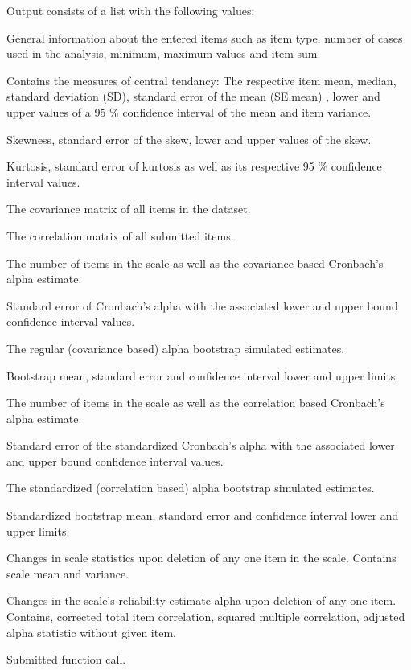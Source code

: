 \begin{Value}
Output consists of a list with the following values:\\

\begin{ldescription}
\item[\code{Variables}] General information about the entered items such as item type, number of cases used in the analysis, minimum, maximum values and item sum. 
\item[\code{Tendency}] Contains the measures of central tendancy: The respective item mean, median, standard deviation (SD), standard error of the mean (SE.mean) , lower and upper values of a 95 \% confidence interval of the mean and item variance. 
\item[\code{Skewness}] Skewness, standard error of the skew, lower and upper values of the skew. 
\item[\code{Kurtosis}] Kurtosis, standard error of kurtosis as well as its respective 95 \% confidence interval values. 
\item[\code{Covariance}] The covariance matrix of all items in the dataset. 
\item[\code{Correlation}] The correlation matrix of all submitted items. 
\item[\code{Alpha}] The number of items in the scale as well as the covariance based Cronbach's alpha estimate. 
\item[\code{Conf.Alpha}] Standard error of Cronbach's alpha with the associated lower and upper bound confidence interval values. 
\item[\code{Bootstrap.Simmulations}] The regular (covariance based) alpha bootstrap simulated estimates. 
\item[\code{Alpha.Bootstrap}] Bootstrap mean, standard error and confidence interval lower and upper limits. 
\item[\code{Std.Alpha}] The number of items in the scale as well as the correlation based Cronbach's alpha estimate. 
\item[\code{Conf.Std.Alpha}] Standard error of the standardized Cronbach's alpha with the associated lower and upper bound confidence interval values. 
\item[\code{Bootstrap.Std.Simmulations}] The standardized (correlation based) alpha bootstrap simulated estimates. 
\item[\code{Alpha.Std.Bootstrap}] Standardized bootstrap mean, standard error and confidence interval lower and upper limits. 
\item[\code{Scale.Stats}] Changes in scale statistics upon deletion of any one item in the scale. Contains scale mean and variance. 
\item[\code{Alpha.Stats}] Changes in the scale's reliability estimate alpha upon deletion of any one item. Contains, corrected total item correlation, squared multiple correlation, adjusted alpha statistic without given item. 
\item[\code{call}] Submitted function call. 
\end{ldescription}
\end{Value}
